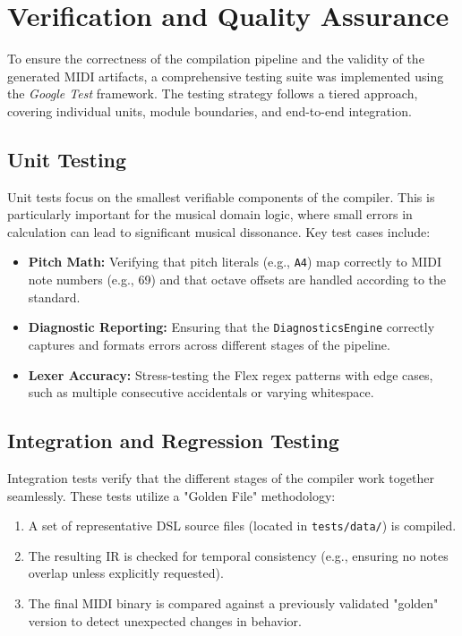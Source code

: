 \section{Verification and Quality Assurance}\label{sec:implementation-verification}

To ensure the correctness of the compilation pipeline and the validity of the generated MIDI artifacts, a comprehensive testing suite was implemented using the \textit{Google Test} framework.
The testing strategy follows a tiered approach, covering individual units, module boundaries, and end-to-end integration.

\subsection{Unit Testing}

Unit tests focus on the smallest verifiable components of the compiler.
This is particularly important for the musical domain logic, where small errors in calculation can lead to significant musical dissonance.
Key test cases include:
\begin{itemize}
    \item \textbf{Pitch Math:} Verifying that pitch literals (e.g., \texttt{A4}) map correctly to MIDI note numbers (e.g., 69) and that octave offsets are handled according to the standard.
    \item \textbf{Diagnostic Reporting:} Ensuring that the \texttt{DiagnosticsEngine} correctly captures and formats errors across different stages of the pipeline.
    \item \textbf{Lexer Accuracy:} Stress-testing the Flex regex patterns with edge cases, such as multiple consecutive accidentals or varying whitespace.
\end{itemize}

\subsection{Integration and Regression Testing}

Integration tests verify that the different stages of the compiler work together seamlessly.
These tests utilize a "Golden File" methodology:
\begin{enumerate}
    \item A set of representative DSL source files (located in \texttt{tests/data/}) is compiled.
    \item The resulting IR is checked for temporal consistency (e.g., ensuring no notes overlap unless explicitly requested).
    \item The final MIDI binary is compared against a previously validated "golden" version to detect unexpected changes in behavior.
\end{enumerate}

